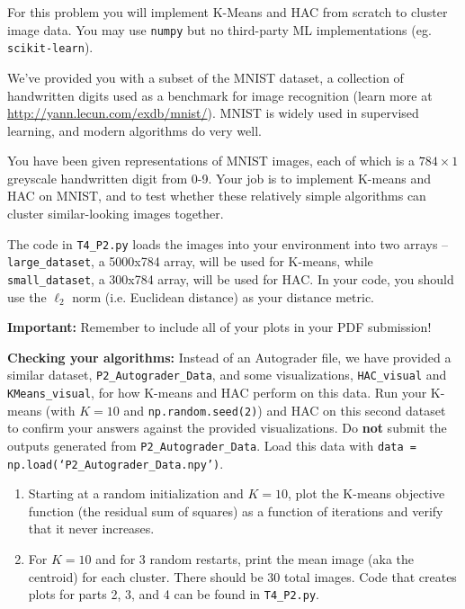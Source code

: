 \documentclass[submit]{harvardml}
\begin{document}
\begin{problem}

For this problem you will implement K-Means and HAC from scratch to cluster image data. You may use \texttt{numpy} but no third-party ML implementations (eg. \texttt{scikit-learn}).

We've provided you with a subset of the MNIST dataset, a collection of
handwritten digits used as a benchmark for image recognition (learn more at
\url{http://yann.lecun.com/exdb/mnist/}). MNIST is widely used in supervised learning, and modern algorithms do very well. 

You have been given
representations of MNIST images, each of which is a $784\times1$
greyscale handwritten digit from 0-9. Your job is to implement K-means and HAC on MNIST, and to test whether these relatively
simple algorithms can cluster similar-looking images together.

The code in \texttt{T4\_P2.py} loads the images into your environment into two arrays -- \texttt{large\_dataset}, a 5000x784 array, will be used for K-means, while \texttt{small\_dataset}, a 300x784 array, will be used for HAC. In your code, you should use the $\ell_2$ norm (i.e. Euclidean distance) as your distance metric.

\textbf{Important:} Remember to include all of your plots in your PDF submission!

\textbf{Checking your algorithms:} Instead of an Autograder file, we have provided a similar dataset, \texttt{P2\_Autograder\_Data}, and some visualizations, \texttt{HAC\_visual} and \texttt{KMeans\_visual}, for how K-means and HAC perform on this data. Run your K-means (with $K=10$ and \texttt{np.random.seed(2)}) and HAC on this second dataset to confirm your answers against the provided visualizations. Do \textbf{not} submit the outputs generated from \texttt{P2\_Autograder\_Data}. Load this data with \texttt{data = np.load(`P2\_Autograder\_Data.npy')}.

\begin{enumerate}

\item Starting at a random initialization and $K = 10$, plot the
  K-means objective function (the residual sum of squares) as a
  function of iterations and verify that it never increases.

\item For $K=10$ and for 3 random restarts, print the mean image (aka
  the centroid) for each cluster. There should be 30 total images. Code 
  that creates plots for parts 2, 3, and 4 can be found in \texttt{T4\_P2.py}.


\end{enumerate}
\end{problem}
\end{document}
